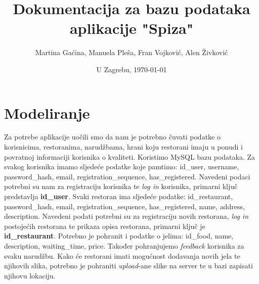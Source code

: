 \documentclass[12pt]{scrartcl}
\begin{document}
\title{Dokumentacija za bazu podataka aplikacije "Spiza"}
\author{Martina Gaćina, Manuela Pleša, Fran Vojković, Alen Živković}
\date{U Zagrebu, \today}
\maketitle
\tableofcontents

\section{Modeliranje}

Za potrebe aplikacije uočili smo da nam je potrebno čuvati podatke o korisnicima, restoranima, narudžbama, hrani koju restorani imaju u ponudi i povratnoj informaciji korisnika o kvaliteti. Koristimo MySQL bazu podataka. Za svakog korisnika imamo sljedeće podatke koje pamtimo: \textsf{id\_user}, \textsf{username}, \textsf{password\_hash}, \textsf{email}, \textsf{registration\_sequence}, \textsf{has\_registered}. Navedeni podaci potrebni su nam za registraciju korisnika te \textit{log in} korisnika, primarni ključ predstavlja \textbf{\textsf{id\_user}}. Svaki restoran ima sljedeće podatke: \textsf{id\_restaurant}, \textsf{password\_hash}, \textsf{email}, \textsf{registration\_sequence}, \textsf{has\_registered}, \textsf{name}, \textsf{address}, \textsf{description}. Navedeni podati potrebni su za registraciju novih restorana, \textit{log in }postojećih restorana te prikaza opisa restorana, primarni ključ je \textbf{\textsf{id\_restaurant}}. Potrebno je pohranit i podatke o jelima: \textsf{id\_food}, \textsf{name}, \textsf{description}, \textsf{waiting\_time}, \textsf{price}. Također pohranjujemo \textit{feedback} korisnika za svaku narudžbu. Kako će restorani imati mogućnost dodavanja novih jela te njihovih slika, potrebno je pohraniti \textit{upload}-ane slike na server te u bazi zapisati njihovu lokaciju.

\pagebreak[2]
\end{document}
